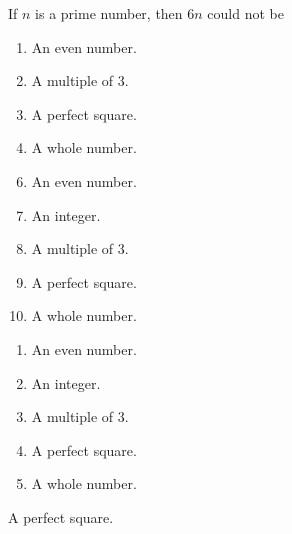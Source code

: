 If $n$ is a prime number, then $6n$ could not be



\ifsat
	\begin{enumerate}[label=\Alph*)]
		\item An even number.
		\item A multiple of 3.
		\item A perfect square.%
		\item A whole number.
	\end{enumerate}
\else
\fi

\ifacteven
	\begin{enumerate}[label=\textbf{\Alph*.},itemsep=\fill,align=left]
		\setcounter{enumii}{5}
		\item An even number.
		\item An integer.
		\item A multiple of 3.
		\addtocounter{enumii}{1}
		\item A perfect square.%
		\item A whole number.
	\end{enumerate}
\else
\fi

\ifactodd
	\begin{enumerate}[label=\textbf{\Alph*.},itemsep=\fill,align=left]
		\item An even number.
		\item An integer.
		\item A multiple of 3.
		\item A perfect square.%
		\item A whole number.
	\end{enumerate}
\else
\fi

\ifgridin
 A perfect square.%
		
\else
\fi

